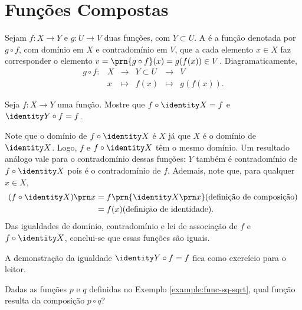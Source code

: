 \section{Funções Compostas}

\begin{definition}
Sejam $f: X \to Y$ e $g: U \to V$ duas funções, com $Y \subset U$. A  é a função denotada por $g \circ f$, com domínio em $X$ e contradomínio em $V$, que a cada elemento $x \in X$ faz corresponder o elemento $v = \prn{g \circ f}(x) = g(f(x)) \in V$. Diagramaticamente,
%
\begin{equation*}
\begin{array}{cccccc}
g \circ f : & X & \to     & Y \subset U & \to & V \\
     &  x & \mapsto & f(x) & \mapsto & g(f(x)).
\end{array}
\end{equation*}
\end{definition}

\begin{example}
Seja $f: X \to Y$ uma função. Mostre que $f \circ \identity X = f$ e $\identity Y \circ f = f$.
\end{example}

\begin{solution}
Note que o domínio de $f \circ \identity X$ é $X$ já que $X$ é o domínio de $\identity X$. Logo, $f$ e $f \circ \identity X$ têm o mesmo domínio.
Um resultado análogo vale para o contradomínio dessas funções:  $Y$ também é contradomínio de $f \circ \identity X$ pois é o contradomínio de $f$.
Ademais, note que, para qualquer $x \in X$, 
%
\begin{align*}
(f \circ \identity X)\prn x &= f\prn{\identity X \prn x} \text{(definição de composição)} \\ &= f(x) \text{(definição de identidade)}.
\end{align*}
% 
Das igualdades de domínio, contradomínio e lei de associação de $f$ e $f \circ \identity X$, conclui-se que essas funções são iguais.

A demonstração da igualdade $\identity Y \circ f = f$ fica como exercício para o leitor.
\end{solution}

\begin{example}
\label{ex:comp-pq}
Dadas as funções $p$ e $q$ definidas no Exemplo \ref{example:func-sq-sqrt}, qual função resulta da composição $p \circ q$?
\end{example}

